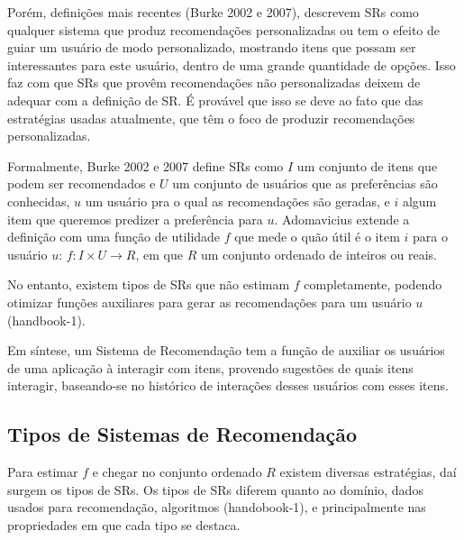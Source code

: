 \documentclass[normaltoc, espacoumemeio, pnumromarab,ruledheader]{abnt}
\begin{document}
Porém, definições mais recentes (Burke 2002 e 2007), descrevem SRs como qualquer sistema que produz recomendações personalizadas ou tem o efeito de guiar um usuário de modo personalizado, mostrando itens que possam ser interessantes para este usuário, dentro de uma grande quantidade de opções. Isso faz com que SRs que provêm recomendações não personalizadas deixem de adequar com a definição de SR. É provável que isso se deve ao fato que das estratégias usadas atualmente, que têm o foco de produzir recomendações personalizadas.

Formalmente, Burke 2002 e 2007 define SRs como $I$ um conjunto de itens que podem ser recomendados e $U$ um conjunto de usuários que as preferências são conhecidas, $u$ um usuário pra o qual as recomendações são geradas, e $i$ algum item que queremos predizer a preferência para $u$. Adomavicius extende a definição com uma função de utilidade $f$ que mede o quão útil é o item $i$ para o usuário $u$: $f: I \times U \rightarrow R$, em que $R$ um conjunto ordenado de inteiros ou reais.

No entanto, existem tipos de SRs que não estimam $f$ completamente, podendo otimizar funções auxiliares para gerar as recomendações para um usuário $u$ (handbook-1).

Em síntese, um Sistema de Recomendação tem a função de auxiliar os usuários de uma aplicação à interagir com itens, provendo sugestões de quais itens interagir, baseando-se no histórico de interações desses usuários com esses itens.



 \subsection{Tipos de Sistemas de Recomendação}
 \label{sec:tipos}

Para estimar $f$ e chegar no conjunto ordenado $R$ existem diversas estratégias, daí surgem os tipos de SRs. Os tipos de SRs diferem quanto ao domínio, dados usados para recomendação, algoritmos (handobook-1), e principalmente nas propriedades em que cada tipo se destaca.
\end{document}
